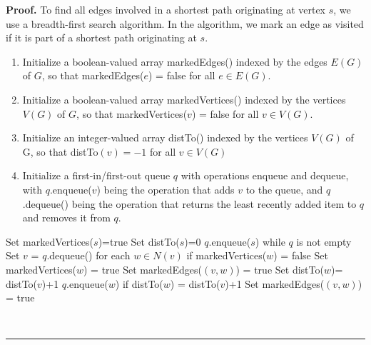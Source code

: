 \documentclass{article}%
\newenvironment{proof}[1][Proof]{\textbf{#1.} }{\ \rule{0.5em}{0.5em}}
\begin{document}
\begin{proof}
To find all edges involved in a shortest path originating at vertex $s$, we
use a breadth-first search algorithm. In the algorithm, we mark an edge as
visited if it is part of a shortest path originating at $s$. \noindent\newline

\begin{enumerate}
\item Initialize a boolean-valued array markedEdges() indexed by the edges
$E(G)$ of $G$, so that markedEdges($e$) = false for all $e \in E(G)$.

\item Initialize a boolean-valued array markedVertices() indexed by the
vertices $V(G)$ of $G$, so that markedVertices($v$) = false for all $v \in
V(G)$.

\item Initialize an integer-valued array distTo() indexed by the vertices
$V(G)$ of G, so that distTo$(v)=-1$ for all $v \in V(G)$

\item Initialize a first-in/first-out queue $q$ with operations enqueue and
dequeue, with $q$.enqueue($v$) being the operation that adds $v$ to the queue,
and $q$.dequeue() being the operation that returns the least recently added
item to $q$ and removes it from $q$.
\end{enumerate}

\indent Set markedVertices($s$)=true \newline\indent Set distTo($s$)=0
\newline\indent $q$.enqueue($s$) \newline\indent while $q$ is not empty
\newline\indent \indent  Set $v$ = $q$.dequeue() \newline\indent \indent  for
each $w \in N(v)$ \newline\indent \indent \indent if markedVertices($w$) =
false \newline\indent \indent \indent \indent Set markedVertices($w$) = true
\newline\indent \indent \indent \indent Set markedEdges($(v,w)$) = true
\newline\indent \indent \indent \indent Set distTo($w$)= distTo($v$)+1
\newline\indent \indent \indent \indent $q$.enqueue($w$) \newline%
\indent \indent \indent if distTo($w$) = distTo($v$)+1 \newline%
\indent \indent \indent \indent Set markedEdges($(v,w)$) = true


\end{proof}
\end{document}
